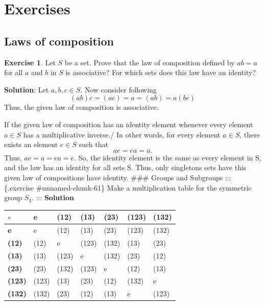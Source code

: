 \documentclass[
]{book}
\theoremstyle{definition}
\theoremstyle{definition}
\theoremstyle{definition}
\newtheorem{exercise}{Exercise}[chapter]
\theoremstyle{definition}
\theoremstyle{remark}
\begin{document}
\hypertarget{exercises}{%
\section{Exercises}\label{exercises}}

\hypertarget{laws-of-composition}{%
\subsection{Laws of composition}\label{laws-of-composition}}

\begin{exercise}
\protect\hypertarget{exr:unnamed-chunk-60}{}\label{exr:unnamed-chunk-60}Let \(S\) be a set. Prove that the law of composition defined by \(ab = a\) for all \(a\) and \(b\) in \(S\) is associative? For which sets does this law have an identity?
\end{exercise}

\textbf{Solution}: Let \(a,b,c\in S\).
Now consider following
\[(ab)c=(ac)=a=(ab)=a(bc)\]
Thus, the given law of composition is associative.

If the given law of composition has an identity element whenever every element \(a\in S\) has a multiplicative inverse./
In other words, for every element \(a\in S\), there exists an element \(e \in S\) such that \[ae = ea = a.\]
Thus, \(ae=a=ea=e\). So, the identity element is the same as every element in S, and the law has an identity for all sets S. Thus, only singletons sets have this given law of compositions have identity.
\#\#\# Groups and Subgroups
::: \{.exercise \#unnamed-chunk-61\}
Make a multiplication table for the symmetric group \(S_3\).
:::
\textbf{Solution}

\begin{longtable}[]{@{}lllllll@{}}
\toprule\noalign{}
\(\circ\) & \textbf{e} & (12) & (13) & (23) & (123) & (132) \\
\midrule\noalign{}
\endhead
\bottomrule\noalign{}
\endlastfoot
\textbf{e} & e & (12) & (13) & (23) & (123) & (132) \\
\textbf{(12)} & (12) & e & (123) & (132) & (13) & (23) \\
\textbf{(13)} & (13) & (123) & e & (132) & (23) & (12) \\
\textbf{(23)} & (23) & (132) & (123) & e & (12) & (13) \\
\textbf{(123)} & (123) & (13) & (23) & (12) & (132) & e \\
\textbf{(132)} & (132) & (23) & (12) & (13) & e & (123) \\
\end{longtable}
\end{document}
